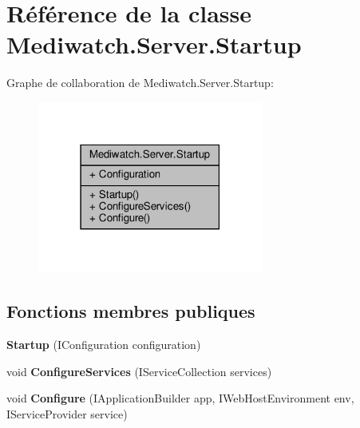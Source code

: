 \hypertarget{class_mediwatch_1_1_server_1_1_startup}{}\section{Référence de la classe Mediwatch.\+Server.\+Startup}
\label{class_mediwatch_1_1_server_1_1_startup}


Graphe de collaboration de Mediwatch.\+Server.\+Startup\+:\nopagebreak
\begin{figure}[H]
\begin{center}
\leavevmode
\includegraphics[width=210pt]{class_mediwatch_1_1_server_1_1_startup__coll__graph}
\end{center}
\end{figure}
\subsection*{Fonctions membres publiques}
\begin{DoxyCompactItemize}
\item 
\mbox{\label{class_mediwatch_1_1_server_1_1_startup_a99779cbd7c184cbff98730a5f285a647}} 
{\bfseries Startup} (I\+Configuration configuration)
\item 
\mbox{\label{class_mediwatch_1_1_server_1_1_startup_a98b7f4b5e49a83c353687ec3c1cfa139}} 
void {\bfseries Configure\+Services} (I\+Service\+Collection services)
\item 
\mbox{\label{class_mediwatch_1_1_server_1_1_startup_a6b5c03c4307414d1af682eafe89039a8}} 
void {\bfseries Configure} (I\+Application\+Builder app, I\+Web\+Host\+Environment env, I\+Service\+Provider service)
\end{DoxyCompactItemize}
